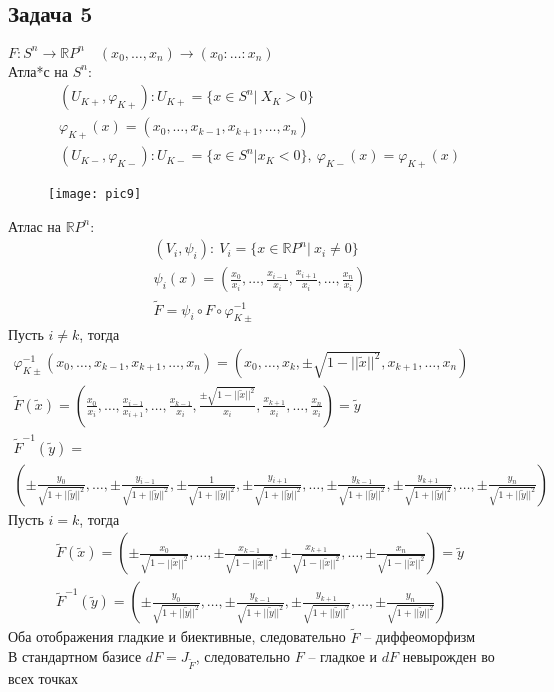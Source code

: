 \subsection*{Задача 5}
	$F: S^n \to \mathbb{R}P^n\quad (x_0,\ldots,x_n) \to (x_0:\ldots:x_n)$\\
	Атла*с на $S^n$:
	\begin{gather*}
	(U_{K+}, \varphi_{K+}): U_{K+} = \{x \in S^{n}|\ X_K > 0\}\\
	\varphi_{K+}(x) = (x_0,\ldots,x_{k-1},x_{k+1},\ldots,x_n)\\
	(U_{K-}, \varphi_{K-}): U_{K-} = \{x \in S^{n}|x_K < 0\},\ \varphi_{K-}(x) = \varphi_{K+}(x)
	\end{gather*}
	\begin{figure}[!h]
		\texttt{[image: pic9]}
	\end{figure}
	Атлас на $\mathbb{R}P^n$:
	\begin{gather*}
		(V_i, \psi_i):\ V_i = \{x \in \mathbb{R}P^n|\ x_i \ne 0\}\\
		\psi_i(x) = \left(\frac{x_0}{x_i},\ldots,\frac{x_{i-1}}{x_i},\frac{x_{i+1}}{x_i},\ldots,\frac{x_n}{x_i}\right)\\
		\tilde{F} = \psi_i \circ F \circ \varphi_{K\pm}^{-1}
	\end{gather*}
	Пусть $i \ne k$, тогда 
	\begin{gather*}
		\varphi_{K\pm}^{-1}(x_0,\ldots,x_{k-1},x_{k+1},\ldots,x_n) = (x_0,\ldots,x_k,\pm\sqrt{1-||\tilde{x}||^2},x_{k+1},\ldots,x_n)\\
		\tilde{F}(\tilde{x}) = (\frac{x_0}{x_i},\ldots,\frac{x_{i-1}}{x_{i+1}}, \ldots, \frac{x_{k-1}}{x_i}, \frac{\pm\sqrt{1-||\tilde{x}||^2}}{x_i},\frac{x_{k+1}}{x_i},\ldots,\frac{x_n}{x_i}) = \tilde{y}\\
		\tilde{F}^{-1}(\tilde{y}) = \\
		\left(\pm\frac{y_0}{\sqrt{1+||\tilde{y}||^2}}, \ldots, \pm\frac{y_{i-1}}{\sqrt{1+||\tilde{y}||^2}}, \pm\frac{1}{\sqrt{1+||\tilde{y}||^2}}, \pm\frac{y_{i+1}}{\sqrt{1+||\tilde{y}||^2}}, \ldots, \pm\frac{y_{k-1}}{\sqrt{1+||\tilde{y}||^2}}, \pm\frac{y_{k+1}}{\sqrt{1+||\tilde{y}||^2}}, \ldots, \pm\frac{y_n}{\sqrt{1+||\tilde{y}||^2}}\right)
	\end{gather*}
	Пусть $i = k$, тогда
	\begin{gather*}
		\tilde{F}(\tilde{x}) = \left(\pm\frac{x_{0}}{\sqrt{1-||\tilde{x}||^2}}, \ldots, \pm\frac{x_{k-1}}{\sqrt{1-||\tilde{x}||^2}}, \pm\frac{x_{k+1}}{\sqrt{1-||\tilde{x}||^2}}, \ldots, \pm\frac{x_{n}}{\sqrt{1-||\tilde{x}||^2}} \right) = \tilde{y}\\
		\tilde{F}^{-1}(\tilde{y}) = \left(\pm\frac{y_{0}}{\sqrt{1 + ||\tilde{y}||^2}}, \ldots, \pm\frac{y_{k-1}}{\sqrt{1 + ||\tilde{y}||^2}}, \pm\frac{y_{k+1}}{\sqrt{1 + ||\tilde{y}||^2}}, \ldots, \pm\frac{y_{n}}{\sqrt{1 + ||\tilde{y}||^2}}\right)
	\end{gather*}
	Оба отображения гладкие и биективные, следовательно $\tilde{F}$ -- диффеоморфизм\\
	В стандартном базисе $dF = J_{\tilde{F}}$, следовательно $F$ -- гладкое и $dF$ невырожден во всех точках


